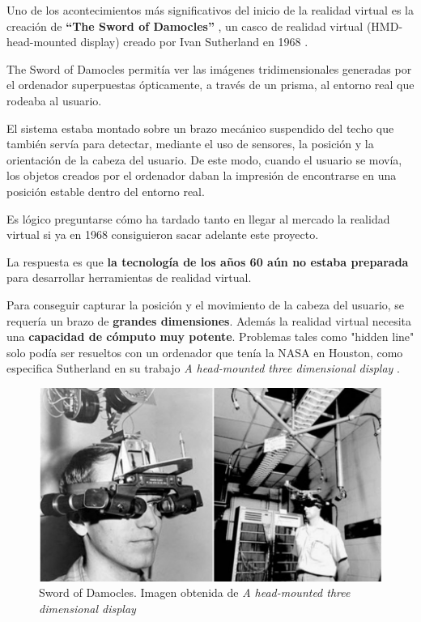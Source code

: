 \documentclass[twoside, 12pt]{epstfg}
\begin{document}
Uno de los  acontecimientos más significativos del inicio de la realidad virtual es la creación de \textbf{“The Sword of Damocles”} , un casco de realidad virtual (HMD- head-mounted display)  creado por Ivan Sutherland en 1968 \cite{Sutherland}.

The Sword of Damocles permitía ver las imágenes tridimensionales generadas por el
ordenador superpuestas ópticamente, a través de un prisma, al entorno real que rodeaba al usuario.

 El sistema estaba montado sobre un brazo mecánico suspendido del techo que también servía para detectar, mediante el uso de sensores, la posición y la orientación de la cabeza del usuario. De este modo, cuando el usuario se movía, los objetos creados por el ordenador daban la impresión de encontrarse en una posición estable dentro del entorno real.

Es lógico preguntarse cómo ha tardado tanto en llegar al mercado la realidad virtual si ya en 1968 consiguieron sacar adelante este proyecto.

La respuesta es que \textbf{la tecnología de los años 60 aún no estaba preparada} para desarrollar herramientas de realidad virtual.

Para conseguir capturar la posición y el movimiento de la cabeza del usuario, se requería un brazo de \textbf{grandes dimensiones}.
Además la realidad virtual necesita una \textbf{capacidad de cómputo muy potente}. Problemas tales como "hidden line" solo podía ser resueltos con un ordenador que tenía la NASA en Houston, como especifica Sutherland en su trabajo \textit{A head-mounted three dimensional display} \cite{Sutherland}. 

\begin{figure}[h]
	\centerline{
		\mbox{\includegraphics[width=.80\textwidth]{images/SwordOfDamocles.jpg}}
	}
	\caption{Sword of Damocles. Imagen obtenida de \textit{A head-mounted three dimensional display} \cite{Sutherland}}
	
\end{figure}
\end{document}
